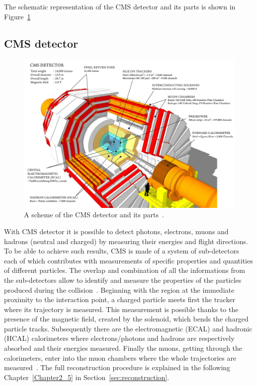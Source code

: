 The schematic representation of the CMS detector and its parts is
shown in Figure~\ref{fig:detector}


\subsection{CMS detector}\label{sec:cmsdetector}
\begin{figure}[h]
\centering
\includegraphics[width=1\textwidth]{Figures/c2/cms_160312_06-compressed.pdf}
\vspace*{3mm}
\caption{A scheme of the CMS detector and its parts~\cite{webpage_cms}.}
\label{fig:detector}
\end{figure} 
With CMS detector it is possible to detect photons, electrons, muons
and hadrons (neutral and charged) by measuring their energies and flight
directions. 
To be able to achieve such results, CMS is made of a system of sub-detectors each of which contributes with
measurements of specific properties and quantities of different 
particles. The overlap and combination of all the
informations from the sub-detectors allow to identify and measure the
properties of the particles produced during the collision~\cite{CMS:particleflow}. Beginning
with the region at the immediate proximity to the interaction point, a
charged particle meets first the tracker where its trajectory is
measured. This measurement is possible thanks to the presence of the
magnetic field, created by the solenoid, which bends the charged
particle tracks. Subsequently there are the
electromagnetic (ECAL) and hadronic (HCAL) calorimeters where
electrons/photons and hadrons are respectively absorbed and their
energies measured. Finally the muons, getting through the
calorimeters, enter into the muon chambers where the whole trajectories
are measured~\cite{CMS:particleflow}. The full reconstruction
procedure is explained in the following Chapter~\ref{Chapter2_5} in Section~\ref{sec:reconstruction}.\\


